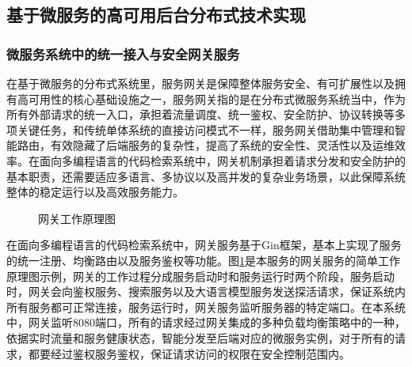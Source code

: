 \documentclass[UTF8,a4paper,12pt]{ctexart}
\numberwithin{equation}{section}
\begin{document}
\subsection{基于微服务的高可用后台分布式技术实现}
\subsubsection{微服务系统中的统一接入与安全网关服务}
在基于微服务的分布式系统里，服务网关是保障整体服务安全、有可扩展性以及拥有高可用性的核心基础设施之一，服务网关指的是在分布式微服务系统当中，作为所有外部请求的统一入口，承担着流量调度、统一鉴权、安全防护、协议转换等多项关键任务，和传统单体系统的直接访问模式不一样，服务网关借助集中管理和智能路由，有效隐藏了后端服务的复杂性，提高了系统的安全性、灵活性以及运维效率。在面向多编程语言的代码检索系统中，网关机制承担着请求分发和安全防护的基本职责，还需要适应多语言、多协议以及高并发的复杂业务场景，以此保障系统整体的稳定运行以及高效服务能力。\par

\begin{figure}[H]
	\caption{网关工作原理图}
	\label{gateway}
\end{figure}


在面向多编程语言的代码检索系统中，网关服务基于Gin框架，基本上实现了服务的统一注册、均衡路由以及服务鉴权等功能。图\ref{gateway}是本服务的网关服务的简单工作原理图示例，网关的工作过程分成服务启动时和服务运行时两个阶段，服务启动时，网关会向鉴权服务、搜索服务以及大语言模型服务发送探活请求，保证系统内所有服务都可正常连接，服务运行时，网关服务监听服务器的特定端口。在本系统中，网关监听8080端口，所有的请求经过网关集成的多种负载均衡策略中的一种，依据实时流量和服务健康状态，智能分发至后端对应的微服务实例，对于所有的请求，都要经过鉴权服务鉴权，保证请求访问的权限在安全控制范围内。\par
\end{document}
